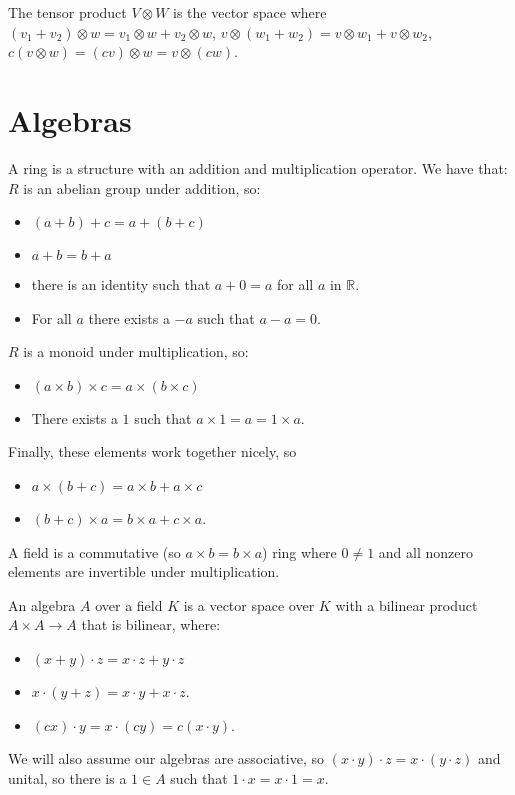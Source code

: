 \documentclass[]{report}
\theoremstyle{definition}
\numberwithin{theorem}{section}
\numberwithin{equation}{section}
\begin{document}
The tensor product $V \otimes W$ is the vector space where $(v_1 + v_2) \otimes w = v_1 \otimes w + v_2 \otimes w$, $v \otimes (w_1 + w_2) = v \otimes w_1 + v \otimes w_2$, $c (v \otimes w) = (cv) \otimes w = v \otimes (cw)$. 

\section{Algebras}
A ring is a structure with an addition and multiplication operator. We have that:
$R$ is an abelian group under addition, so:
\begin{itemize}
	\item $(a + b) + c = a + (b + c)$
	\item $a + b = b + a$
	\item there is an identity such that $a + 0 = a$ for all $a$ in $\mathbb{R}$.
	\item For all $a$ there exists a $-a$ such that $a - a = 0$. 
\end{itemize}
$R$ is a monoid under multiplication, so:
\begin{itemize}
	\item $(a \times b) \times c = a \times (b \times c)$
	\item There exists a $1$ such that $a \times 1 = a = 1 \times a$.
\end{itemize}
Finally, these elements work together nicely, so
\begin{itemize}
	\item $a \times (b + c) = a \times b + a \times c$
	\item $(b + c) \times a = b \times a + c \times a$. 
\end{itemize}

A field is a commutative (so $a \times b = b \times a$) ring where $0 \neq 1$ and all nonzero elements are invertible under multiplication.

An algebra $A$ over a field $K$ is a vector space over $K$ with a bilinear product $A \times A \rightarrow A$ that is bilinear, where:
\begin{itemize}
	\item $(x + y) \cdot z = x \cdot z + y \cdot z$
	\item $x  \cdot (y + z) = x \cdot y + x \cdot z$.
	\item $(cx) \cdot y = x \cdot (cy) = c (x \cdot y)$.
\end{itemize}
We will also assume our algebras are associative, so $(x \cdot y) \cdot z = x \cdot (y \cdot z)$ and unital, so there is a $1 \in A$ such that $1 \cdot x = x \cdot 1 = x$.
\end{document}
